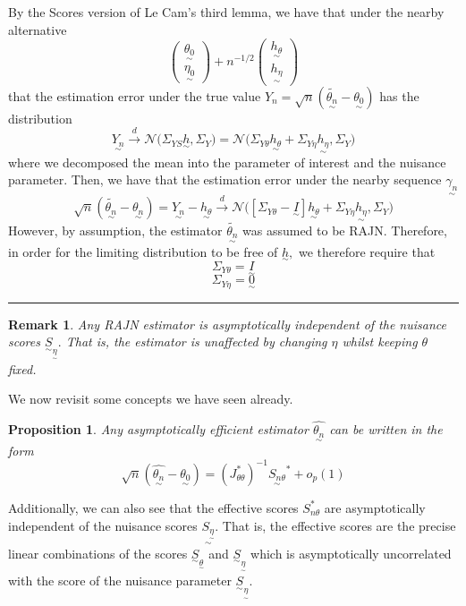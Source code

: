 \documentclass[twoside]{article}
\newtheorem{proposition}[theorem]{Proposition}
\newtheorem{remark}[theorem]{Remark}
\newenvironment{proof}{{\bf Proof:}}{\hfill\rule{2mm}{2mm}}
\newcommand{\utilde}{\underset{\sim}}
\begin{document}
\begin{proof} By the Scores version of Le Cam's third lemma, we have that under the nearby alternative $$
\begin{pmatrix}
\utilde{\theta_0}\\
\utilde{\eta_0}
\end{pmatrix}
 + n^{-1/2}
\begin{pmatrix}
\utilde{h_{\theta}}\\
\utilde{h_{\eta}}
\end{pmatrix}
$$
that the estimation error under the true value $Y_n = \sqrt{n}(\utilde{\tilde{\theta_n}} - \utilde{\theta_0})$ has the distribution
$$
\utilde{Y_n} \xrightarrow{d} \mathcal{N}\bigg(\Sigma_{YS}\utilde{h}, \Sigma_Y \bigg) = \mathcal{N}\bigg(\Sigma_{Y\theta}\utilde{h_{\theta}} + \Sigma_{Y\eta}\utilde{h_{\eta}}, \Sigma_Y \bigg)
$$
where we decomposed the mean into the parameter of interest and the nuisance parameter. Then, we have that the estimation error under the nearby sequence $\utilde{\gamma_n}$
$$
\sqrt{n}(\utilde{\tilde{\theta_n}} - \utilde{\theta_n}) = \utilde{Y_n} - \utilde{h_{\theta}} \xrightarrow{d} \mathcal{N}\bigg([\Sigma_{Y\theta} - \utilde{I}]\utilde{h_{\theta}} + \Sigma_{Y \eta}\utilde{h_{\eta}}, \Sigma_Y \bigg)
$$
However, by assumption, the estimator $\utilde{\tilde{\theta_n}}$ was assumed to be RAJN. Therefore, in order for the limiting distribution to be free of $\utilde{h},$ we therefore require that 
$$
\Sigma_{Y \theta} = \utilde{I}
$$
$$
\Sigma_{Y \eta} = \utilde{0}
$$
\end{proof}

\begin{remark}Any RAJN estimator is asymptotically independent of the nuisance scores $\utilde{S}_{\utilde{\eta}}.$ That is, the estimator is unaffected by changing $\eta$ whilst keeping $\theta$ fixed.
\end{remark}

We now revisit some concepts we have seen already.

\begin{proposition}Any asymptotically efficient estimator $\hat{\utilde{\theta_n}}$ can be written in the form
$$
\sqrt{n}(\hat{\utilde{\theta_n}} - \utilde{\theta_0}) = (J_{\theta \theta}^{*})^{-1}\utilde{S_{n\theta}}^{*} + o_p(1)
$$
\end{proposition}

Additionally, we can also see that the effective scores $S_{n \theta}^{*}$ are asymptotically independent of the nuisance scores $\utilde{S_{\utilde{\eta}}}.$ That is, the effective scores are the precise linear combinations of the scores $\utilde{S}_{\utilde{\theta}}$ and $\utilde{S}_{\utilde{\eta}}$ which is asymptotically uncorrelated with the score of the nuisance parameter $\utilde{S}_{\utilde{\eta}}$.
\end{document}
